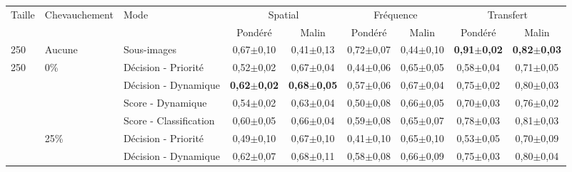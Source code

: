 \begin{landscape}
\begin{table}[p]
    \centering
    \begin{tabular}{lllcccccc}
		\toprule
		\multirow{2}{*}{Taille}     & \multirow{2}{*}{Chevauchement}& \multirow{2}{*}{Mode}     & \multicolumn{2}{c}{Spatial}                   & \multicolumn{2}{c}{Fréquence}                 & \multicolumn{2}{c}{Transfert}                 \\
		                            &                               &                           & Pondéré               & Malin                 & Pondéré               & Malin                 & Pondéré               & Malin                 \\ \midrule
		250                         & Aucune                        & Sous-images               & 0,67$\pm$0,10         & 0,41$\pm$0,13         & 0,72$\pm$0,07         & 0,44$\pm$0,10         & \textbf{0,91$\pm$0,02}& \textbf{0,82$\pm$0,03}\\ \midrule
		\multirow{12}{*}{250}       & \multirow{4}{*}{0\%}          & Décision - Priorité       & 0,52$\pm$0,02         & 0,67$\pm$0,04         & 0,44$\pm$0,06         & 0,65$\pm$0,05         & 0,58$\pm$0,04         & 0,71$\pm$0,05         \\ 
							        &                               & Décision - Dynamique      & \textbf{0,62$\pm$0,02}& \textbf{0,68$\pm$0,05}& 0,57$\pm$0,06         & 0,67$\pm$0,04         & 0,75$\pm$0,02         & 0,80$\pm$0,03         \\
							        &                               & Score - Dynamique         & 0,54$\pm$0,02         & 0,63$\pm$0,04         & 0,50$\pm$0,08         & 0,66$\pm$0,05         & 0,70$\pm$0,03         & 0,76$\pm$0,02         \\
							        &                               & Score - Classification    & 0,60$\pm$0,05         & 0,66$\pm$0,04         & 0,59$\pm$0,08         & 0,65$\pm$0,07         & 0,78$\pm$0,03         & 0,81$\pm$0,03         \\ \cline{2-9}
							        & \multirow{4}{*}{25\%}         & Décision - Priorité       & 0,49$\pm$0,10         & 0,67$\pm$0,10         & 0,41$\pm$0,10         & 0,65$\pm$0,10         & 0,53$\pm$0,05         & 0,70$\pm$0,09         \\
							        &                               & Décision - Dynamique      & 0,62$\pm$0,07         & 0,68$\pm$0,11         & 0,58$\pm$0,08         & 0,66$\pm$0,09         & 0,75$\pm$0,03         & 0,80$\pm$0,04         \\

\end{tabular}
\end{table}
\end{landscape}
